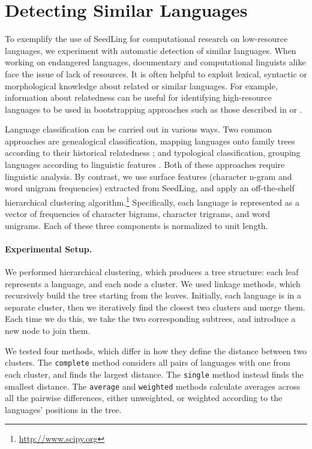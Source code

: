 \section{Detecting Similar Languages} \label{sec:cluster}

To exemplify the use of SeedLing for computational research on low-resource languages, we experiment with automatic detection of similar languages. When working on endangered languages, documentary and computational linguists alike face the issue of lack of resources. It is often helpful to exploit lexical, syntactic or morphological knowledge about related or similar languages. For example, information about relatedness can be useful for identifying high-resource languages to be used in bootstrapping approaches such as those described in  or .

Language classification can be carried out in various ways. Two common approaches are genealogical classification, mapping languages onto family trees according to their historical relatedness \cite{swadesh1952,starostin2010}; and typological classification, grouping languages according to linguistic features \cite{georgi2010wals,daume2009}. Both of these approaches require linguistic analysis. By contrast, we use surface features (character n-gram and word unigram frequencies) extracted from SeedLing, and apply an off-the-shelf hierarchical clustering algorithm.\footnote{\url{http://www.scipy.org}} Specifically, each language is represented as a vector of frequencies of character bigrams, character trigrams, and word unigrams. Each of these three components is normalized to unit length.

\paragraph{Experimental Setup.}
We performed hierarchical clustering, which produces a tree structure: each leaf represents a language, and each node a cluster. We used linkage methods, which recursively build the tree starting from the leaves. Initially, each language is in a separate cluster, then we iteratively find the closest two clusters and merge them. Each time we do this, we take the two corresponding subtrees, and introduce a new node to join them.

We tested four methods, which differ in how they define the distance between two clusters. The \texttt{complete} method considers all pairs of languages with one from each cluster, and finds the largest distance. The \texttt{single} method instead finds the smallest distance. The \texttt{average} and \texttt{weighted} methods calculate averages across all the pairwise differences, either unweighted, or weighted according to the languages' positions in the tree.

